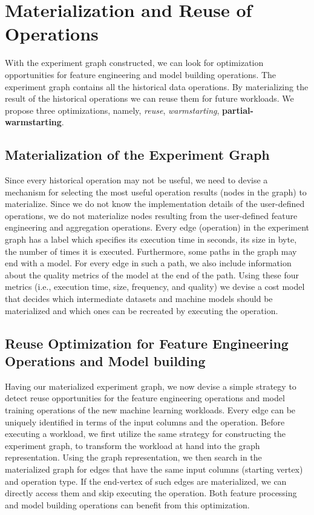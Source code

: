 \section{Materialization and Reuse of Operations}\label{sec-materializaiton-and-reuse}
With the experiment graph constructed, we can look for optimization opportunities for feature engineering and model building operations.
The experiment graph contains all the historical data operations.
By materializing the result of the historical operations we can reuse them for future workloads.
We propose three optimizations, namely, \textit{reuse}, \textit{warmstarting}, \textbf{partial-warmstarting}.

\subsection{Materialization of the Experiment Graph}
Since every historical operation may not be useful, we need to devise a mechanism for selecting the most useful operation results (nodes in the graph) to materialize.
Since we do not know the implementation details of the user-defined operations, we do not materialize nodes resulting from the user-defined feature engineering and aggregation operations.
Every edge (operation) in the experiment graph has a label which specifies its execution time in seconds, its size in byte, the number of times it is executed.
Furthermore, some paths in the graph may end with a model.
For every edge in such a path, we also include information about the quality metrics of the model at the end of the path.
Using these four metrics (i.e., execution time, size, frequency, and quality) we devise a cost model that decides which intermediate datasets and machine models should be materialized and which ones can be recreated by executing the operation.

\subsection{Reuse Optimization for Feature Engineering Operations and Model building}
Having our materialized experiment graph, we now devise a simple strategy to detect reuse opportunities for the feature engineering operations and model training operations of the new machine learning workloads.
Every edge can be uniquely identified in terms of the input columns and the operation.
Before executing a workload, we first utilize the same strategy for constructing the experiment graph, to transform the workload at hand into the graph representation.
Using the graph representation, we then search in the materialized graph for edges that have the same input columns (starting vertex) and operation type.
If the end-vertex of such edges are materialized, we can directly access them and skip executing the operation.
Both feature processing and model building operations can benefit from this optimization.


